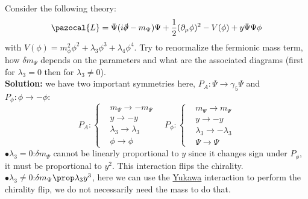 \documentclass[../main.tex]{subfiles}
\begin{document}
\begin{exercise}
Consider the following theory:
\[
\pazocal{L}=\bar{\Psi}(i\slashed{\partial}-m_\Psi)\Psi+\frac{1}{2}(\partial_\mu\phi)^2-V(\phi)+y\bar{\Psi}\Psi\phi
\]
with $V(\phi)=m_\phi^2\phi^2+\lambda_3\phi^3+\lambda_4\phi^4$. Try to renormalize the fermionic mass term, how $\delta m_\Psi$ depends on the parameters and what are the associated diagrams (first for $\lambda_3=0$ then for $\lambda_3\neq0$).\\
\textbf{Solution:} we have two important symmetries here, $P_A:\Psi\to\gamma_5\Psi$ and $P_\phi: \phi\to-\phi:$
\[
P_A:
\left\{
\begin{aligned}
&m_\Psi\to-m_\Psi\\
&y\to-y\\
&\lambda_3\to\lambda_3\\
&\phi\to\phi
\end{aligned}
\right.
\quad 
P_\phi:
\left\{
\begin{aligned}
&m_\Psi\to m_\Psi\\
&y\to-y\\
&\lambda_3\to-\lambda_3\\
&\Psi\to\Psi
\end{aligned}
\right.
\]
$\bullet\lambda_3=0$:\;$\delta m_\Psi$ cannot be linearly proportional to $y$ since it changes sign under $P_\phi$, it must be proportional to $y^2$. 
This interaction flips the chirality.\\
$\bullet\lambda_3\neq0$:\;$\delta m_\Psi\prop\lambda_3y^3$, here we can use the \href{https://en.wikipedia.org/wiki/Hideki_Yukawa}{Yukawa} interaction to perform the chirality flip, we do not necessarily need the mass to do that.
\end{exercise}
\end{document}

